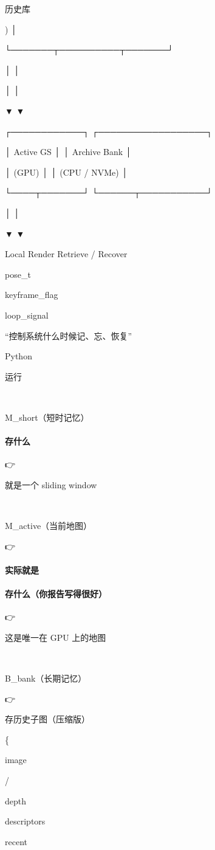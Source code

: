 \documentclass[12pt]{article}
\begin{document}
历史库

) │

└───────┬──────────┬───────┘

│ │

│ │

▼ ▼

┌────────────┐ ┌──────────────────┐

│ Active GS │ │ Archive Bank │

│ (GPU) │ │ (CPU / NVMe) │

└────┬───────┘ └──────┬───────────┘

│ │

▼ ▼

Local Render Retrieve / Recover

pose\_t

keyframe\_flag

loop\_signal

“控制系统什么时候记、忘、恢复”

Python

运行

🔹

M\_short（短时记忆）

\paragraph{存什么}
👉

就是一个 sliding window

🔹

M\_active（当前地图）

👉

\paragraph{实际就是}
\paragraph{存什么（你报告写得很好）}
👉

这是唯一在 GPU 上的地图

🔹

B\_bank（长期记忆）

👉

存历史子图（压缩版）

\{

image

/

depth

descriptors

recent
\end{document}

